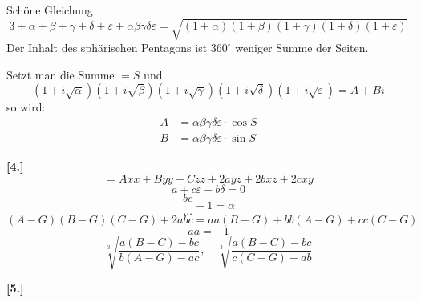 \documentclass[10pt,a4paper]{article}
\begin{document}
Sch\"one Gleichung
%
\begin{equation*}
3 + \alpha + \beta + \gamma + \delta + \varepsilon + \alpha\beta\gamma\delta\varepsilon =
\sqrt{(1 + \alpha)(1 + \beta)(1 + \gamma)(1 + \delta)(1 + \varepsilon)}
\end{equation*}
%
Der Inhalt des sph\"arischen Pentagons ist $360^{\circ}$ weniger Summe der Seiten.

Setzt man die Summe $= S$ und
%
\begin{equation*}
(1 + i\sqrt{\alpha})(1 + i\sqrt{\beta})(1 + i\sqrt{\gamma})(1 + i\sqrt{\delta})(1 + i\sqrt{\varepsilon}) = A + Bi
\end{equation*}
%
so wird:
%
\begin{align*}
A &= \alpha\beta\gamma\delta\varepsilon \cdot \cos S \\
B &= \alpha\beta\gamma\delta\varepsilon \cdot \sin S
\end{align*}

\textbf{[4.]}
%
\begin{equation*}
= Axx + Byy + Czz + 2ayz + 2bxz + 2cxy
\end{equation*}
%
\begin{equation*}
[A - G]a + c\varepsilon + b\delta = 0
\end{equation*}
%
\begin{equation*}
\frac{bc}{\cdots} + 1 = \alpha
\end{equation*}
%
\begin{equation*}
(A - G)(B - G)(C - G) + 2abc = aa(B - G) + bb(A - G) + cc(C - G)
\end{equation*}
%
\begin{equation*}
aa = -1
\end{equation*}
%
\begin{equation*}
\sqrt[3]{\frac{a(B - C) - bc}{b(A - G) - ac}}, \quad
\sqrt[3]{\frac{a(B - C) - bc}{c(C - G) - ab}}
\end{equation*}

\newpage
\textbf{[5.]}
\end{document}
